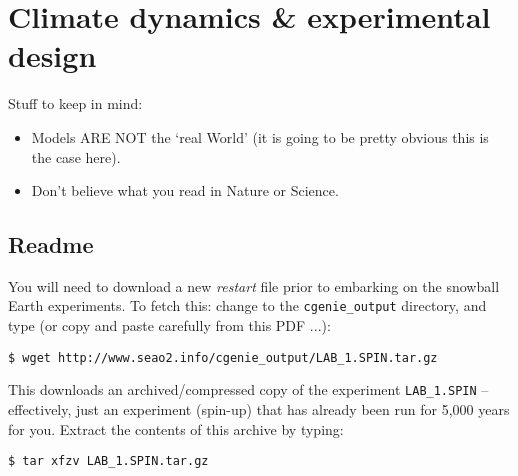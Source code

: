 \documentclass[11pt,fleqn]{book} %
\begin{document}

\cleardoublepage


\chapter{Climate dynamics \& experimental design}

\hfill \break

\noindent Stuff to keep in mind:

\begin{itemize}
\vspace{1mm}
\item Models ARE NOT the ‘real World’ (it is going to be pretty obvious this is the case here).
\vspace{1mm}
\item Don’t believe what you read in Nature or Science.
\end{itemize}


\newpage


\section*{Readme}

You will need to download a new \textit{restart} file prior to embarking on the snowball Earth experiments.
To fetch this: change to the \texttt{cgenie\_output} directory, and type (or copy and paste carefully from this PDF ...):
\vspace{-2mm}
\begin{verbatim}
$ wget http://www.seao2.info/cgenie_output/LAB_1.SPIN.tar.gz
\end{verbatim}
\vspace{-2mm}

This downloads an archived/compressed copy of the experiment \texttt{LAB\_1.SPIN} – effectively, just an experiment (spin-up) that has already been run for 5,000 years for you. Extract the contents of this archive by typing:
\vspace{-2mm}
\begin{verbatim}
$ tar xfzv LAB_1.SPIN.tar.gz 
\end{verbatim}
\vspace{-2mm}
\end{document}
